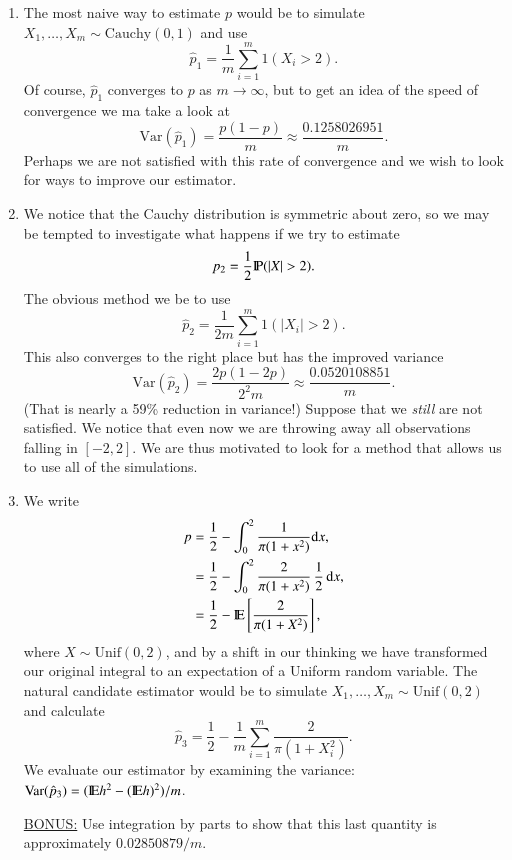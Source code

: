 \documentclass[captions=tableheading]{scrbook}
\begin{document}
\begin{enumerate}
\item The most naive way to estimate $p$ would be to simulate $X_{1},\ldots,X_{m} \sim \mathrm{Cauchy}(0,1)$ and use 
   \[
   \hat{p}_{1}=\frac{1}{m}\sum_{i=1}^{m}1(X_{i}>2).
   \]
   Of course, $\hat{p}_{1}$ converges to $p$ as $m\to\infty$, but to get an idea of the speed of convergence we ma take a look at 
   \[
   \mbox{Var}(\hat{p}_{1})=\frac{p(1-p)}{m}\approx\frac{0.1258026951}{m}.
   \]
   Perhaps we are not satisfied with this rate of convergence and we wish to look for ways to improve our estimator.
\item We notice that the Cauchy distribution is symmetric about zero, so we may be tempted to investigate what happens if we try to estimate
   \[
   p_{2}=\frac{1}{2}\P(|X|>2).
   \]
   The obvious method we be to use 
   \[
   \hat{p}_{2}=\frac{1}{2m}\sum_{i=1}^{m}1(|X_{i}|>2).
   \]
   This also converges to the right place but has the improved variance
   \[
   \mbox{Var}(\hat{p}_{2})=\frac{2p(1-2p)}{2^{2}m}\approx\frac{0.0520108851}{m}.
   \]
   (That is nearly a 59\% reduction in variance!) Suppose that we \emph{still} are not satisfied. We notice that even now we are throwing away all observations falling in $[-2,2]$. We are thus motivated to look for a method that allows us to use all of the simulations.
\item We write 
   \begin{align*}
   p & =\frac{1}{2}-\int_{0}^{2}\frac{1}{\pi(1+x^{2})}\mathrm{d} x,\\
   & =\frac{1}{2}-\int_{0}^{2}\frac{2}{\pi(1+x^{2})}\,\frac{1}{2}\,\mathrm{d} x,\\
   & =\frac{1}{2}-\mathrm{I\hspace{-1.5pt}E}\left[\frac{2}{\pi(1+X^{2})}\right],
   \end{align*}
   where $X\sim\mathrm{Unif}(0,2)$, and by a shift in our thinking we have transformed our original integral to an expectation of a Uniform random variable. The natural candidate estimator would be to simulate $X_{1},\ldots,X_{m}\sim\mathrm{Unif}(0,2)$ and calculate
   \[
   \hat{p}_{3}=\frac{1}{2}-\frac{1}{m}\sum_{i=1}^{m}\frac{2}{\pi(1+X_{i}^{2})}.
   \]
   We evaluate our estimator by examining the variance: $\mbox{Var}(\hat{p}_{3})=(\mathrm{I\hspace{-1.5pt}E} h^{2}-(\mathrm{I\hspace{-1.5pt}E} h)^{2})/m$.

   \underline{BONUS:} Use integration by parts to show that this last quantity is approximately $0.02850879/m$.


\end{enumerate}
\end{document}
